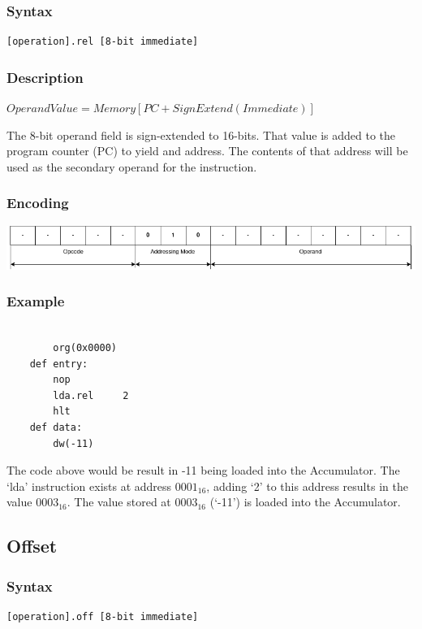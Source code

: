 \subsubsection{Syntax}
\begin{verbatim}[operation].rel [8-bit immediate]\end{verbatim}

\subsubsection{Description}
$OperandValue = Memory[PC + SignExtend(Immediate)]$
\par The 8-bit operand field is sign-extended to 16-bits.
That value is added to the program counter (PC) to yield and address.
The contents of that address will be used as the secondary operand for the instruction.

\subsubsection{Encoding}
\begin{center}
    \includegraphics[scale=0.40]{img/Andromeda-REL.drawio}
\end{center}

\subsubsection{Example}
\begin{verbatim}

        org(0x0000)
    def entry:
        nop
        lda.rel     2
        hlt
    def data:
        dw(-11)

\end{verbatim}
The code above would be result in -11 being loaded into the Accumulator.
The `lda' instruction exists at address $0001_{16}$, adding `2' to this address results in the value $0003_{16}$.
The value stored at $0003_{16}$ (`-11') is loaded into the Accumulator.
\pagebreak

\subsection{Offset}\label{subsec:relative-jump}
\subsubsection{Syntax}
\begin{verbatim}[operation].off [8-bit immediate]\end{verbatim}

